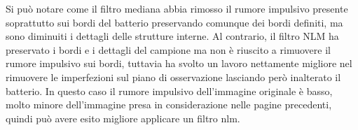 \documentclass[../main.tex]{subfiles}
\begin{document}
Si può notare come il filtro mediana abbia rimosso il rumore impulsivo presente soprattutto sui bordi del batterio preservando comunque dei bordi definiti, ma sono diminuiti i dettagli delle strutture interne. Al contrario, il filtro NLM ha preservato i bordi e i dettagli del campione ma non è riuscito a rimuovere il rumore impulsivo sui bordi, tuttavia ha svolto un lavoro nettamente migliore nel rimuovere le imperfezioni sul piano di osservazione lasciando però inalterato il batterio. In questo caso il rumore impulsivo dell'immagine originale è basso, molto minore dell'immagine presa in considerazione nelle pagine precedenti, quindi può avere esito migliore applicare un filtro \acrshort{nlm}.
\end{document}
